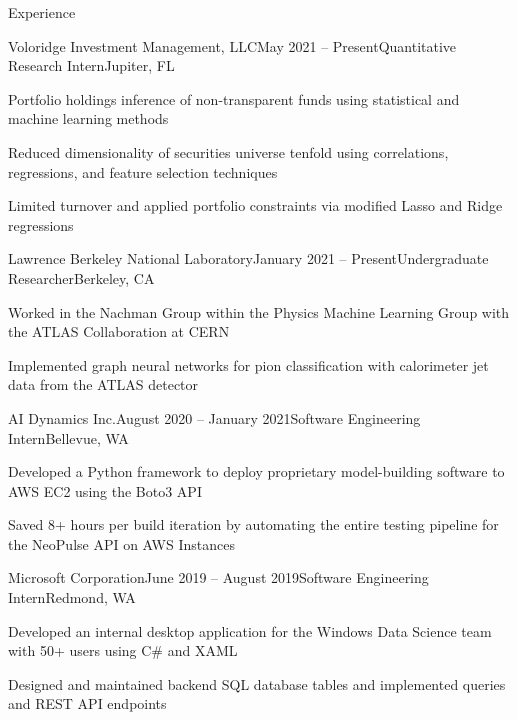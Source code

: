\documentclass{resume} %
\begin{document}
\begin{rSection}{Experience}

\begin{rSubsection}{Voloridge Investment Management, LLC}{May 2021 – Present}{Quantitative Research Intern}{Jupiter, FL}
    \item Portfolio holdings inference of non-transparent funds using statistical and machine learning methods
    \item Reduced dimensionality of securities universe tenfold using correlations, regressions, and feature selection techniques
    \item Limited turnover and applied portfolio constraints via modified Lasso and Ridge regressions
\end{rSubsection}

\begin{rSubsection}{Lawrence Berkeley National Laboratory}{January 2021 – Present}{Undergraduate Researcher}{Berkeley, CA}
    \item Worked in the Nachman Group within the Physics Machine Learning Group with the ATLAS Collaboration at CERN
    \item Implemented graph neural networks for pion classification with calorimeter jet data from the ATLAS detector
\end{rSubsection}

\begin{rSubsection}{AI Dynamics Inc.}{August 2020 – January 2021}{Software Engineering Intern}{Bellevue, WA}
    \item Developed a Python framework to deploy proprietary model-building software to AWS EC2 using the Boto3 API
    \item Saved 8+ hours per build iteration by automating the entire testing pipeline for the NeoPulse API on AWS Instances
\end{rSubsection}

\begin{rSubsection}{Microsoft Corporation}{June 2019 – August 2019}{Software Engineering Intern}{Redmond, WA}
    \item Developed an internal desktop application for the Windows Data Science team with 50+ users using C\# and XAML
    \item Designed and maintained backend SQL database tables and implemented queries and REST API endpoints
\end{rSubsection}


\end{rSection}
\end{document}
